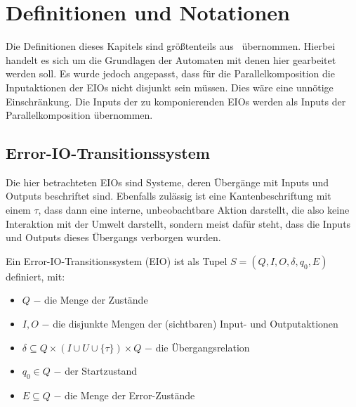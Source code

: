 \chapter{Definitionen und Notationen}

Die Definitionen dieses Kapitels sind größtenteils aus~\cite{Vogler2014EIO}
übernommen. Hierbei handelt es sich um die Grundlagen der Automaten mit denen
hier gearbeitet werden soll. Es wurde jedoch angepasst, dass für die
Parallelkomposition die Inputaktionen der EIOs nicht disjunkt sein müssen. Dies
wäre eine unnötige Einschränkung. Die Inputs der zu komponierenden EIOs werden
als Inputs der Parallelkomposition übernommen.

\section{Error-IO-Transitionssystem}
Die hier betrachteten EIOs sind Systeme, deren Übergänge mit Inputs und Outputs
beschriftet sind. Ebenfalls zulässig ist eine Kantenbeschriftung mit einem
$\tau$, dass dann eine interne, unbeobachtbare Aktion darstellt, die also keine Interaktion mit
der Umwelt darstellt, sondern meist dafür steht, dass die Inputs und Outputs
dieses Übergangs verborgen wurden.

\begin{Def}
  Ein Error-IO-Transitionssystem (EIO) ist
  als Tupel $S=(Q,I,O,\delta, q_0, E)$ definiert, mit:
  \begin{itemize}
    \item $Q$ $-$ die Menge der Zustände
    \item $I,O$ $-$ die disjunkte Mengen der (sichtbaren) Input- und Outputaktionen
    \item $\delta\subseteq Q\times (I\cup U\cup\{\tau\})\times Q$ $-$ die
      Übergangsrelation
    \item $q_0\in Q$ $-$ der Startzustand
    \item $E\subseteq Q$ $-$ die Menge der Error-Zustände
  \end{itemize}
\end{Def}

